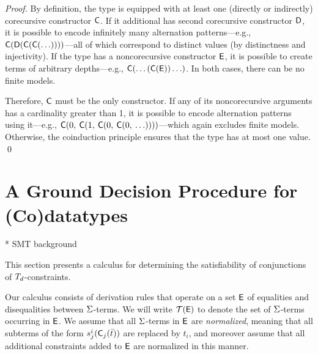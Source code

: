\begin{proof}
By definition, the type is equipped with at least one (directly or indirectly)
corecursive constructor $\textsf{C}$. If it additional has second
corecursive constructor $\textsf{D}$, it is possible to encode infinitely many
alternation patterns---e.g.,
$\textsf{C}(\textsf{D}(\textsf{C}(\textsf{C}(\ldots))))$---all of which correspond
to distinct values (by distinctness and injectivity). If the type has a
noncorecursive constructor $\textsf{E}$, it is possible to create terms of
arbitrary depths---e.g., $\textsf{C}(\ldots(\textsf{C}(\textsf{E}))\ldots)$. In
both cases, there can be no finite models.

Therefore, $\textsf{C}$ must be the only constructor.
If any of its noncorecursive arguments has a cardinality greater than 1,
it is possible to encode alternation patterns using it---e.g.,
$\textsf{C}(0,\: \textsf{C}(1,\: \textsf{C}(0,\: \textsf{C}(0,\: \ldots))))$---which
again excludes finite models. Otherwise, the coinduction principle ensures
that the type has at most one value.
\qed
\end{proof}


\section{A Ground Decision Procedure for (Co)datatypes}
\label{sec:a-ground-decision-procedure-for-co-datatypes}

  * SMT background

This section presents a calculus for determining the satisfiability of conjunctions of $T_{d}$-constraints.

Our calculus consists of derivation rules that operate on a set $\mathsf{E}$ of equalities and disequalities between $\mathrm{\Sigma}$-terms.
We will write $\mathcal{T}(\mathsf{E})$ to denote the set of $\mathrm{\Sigma}$-terms occurring in $\mathsf{E}$.
We assume that all $\mathrm{\Sigma}$-terms in $\mathsf{E}$ are \emph{normalized}, meaning that all subterms of the form $s^i_j( \textsf{C}_j( \bar t ) )$
are replaced by $t_i$, and moreover assume that all additional constraints added to $\mathsf{E}$ are normalized in this manner.

